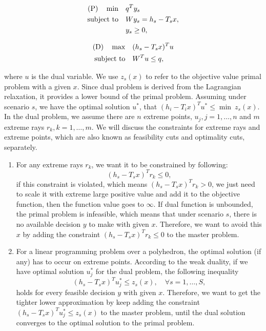 \documentclass[preprint,review,11pt,authoryear]{elsarticle}
\begin{document}
\vspace{-3em}
\begin{multicols}{2}
    \begin{align*}
        \text{(P)} \quad  \min \quad & q^T y_s \\
                    \operatorname{subject~to} \quad & Wy_s = h_s - T_s x, \\
                                     &  y_s \geq 0,
    \end{align*}
    \columnbreak
    
    \begin{align*}
        \text{(D)} \quad \max \quad & (h_s - T_s x)^T u \\
                   \operatorname{subject~to} \quad & W^T u \leq q,
    \end{align*}
\end{multicols}
\vspace{-3em}
where $u$ is the dual variable. We use $z_s(x)$ to refer to the objective value primal problem with a given $x$. Since dual problem is derived from the Lagrangian relaxation, it  provides a lower bound of the primal problem. Assuming under scenario $s$, we have the optimal solution $u^*$, that $(h_i - T_i x)^T u^* \leq \min ~z_s(x)$. 
In the dual problem, we assume there are $n$ extreme points, $u_j, j = 1,\dots,n$ and $m$ extreme rays $r_k, k = 1,\dots,m$. We will discuss the constraints for extreme rays and extreme points, which are also known as feasibility cuts and optimality cuts, separately.
\begin{enumerate}
    \item[1.] For any extreme rays $r_k$, we want it to be constrained by following:
        \begin{equation*}
            (h_s - T_s x)^T r_k \leq 0,
        \end{equation*}
        if this constraint is violated, which means $(h_s - T_s x)^T r_k > 0$, we just need to scale it with extreme large positive value and add it to the objective function, then the function value goes to $\infty$. If dual function is unbounded, the primal problem is infeasible, which means that under scenario $s$, there is no available decision $y$ to make with given $x$. Therefore, we want to avoid this $x$ by adding the constraint $(h_s - T_s x)^T r_k \leq 0$ to the master problem.
        
    \item[2.] For a linear programming problem over a polyhedron, the optimal solution (if any) has to occur on extreme points. According to the weak duality, if we have optimal solution $u^*_j$ for the dual problem, the following inequality
        \begin{equation*}
            (h_s - T_s x)^T u^*_j \leq z_s(x), \quad \forall s = 1,\dots,S,
        \end{equation*}
        holds for every feasible decision $y$ with given $x$. Therefore, we want to get the tighter lower approximation by keep adding the constraint $(h_s - T_s x)^T u^*_j \leq z_s(x)$ to the master problem, until the dual solution converges to the optimal solution to the primal problem.
\end{enumerate}
\end{document}
